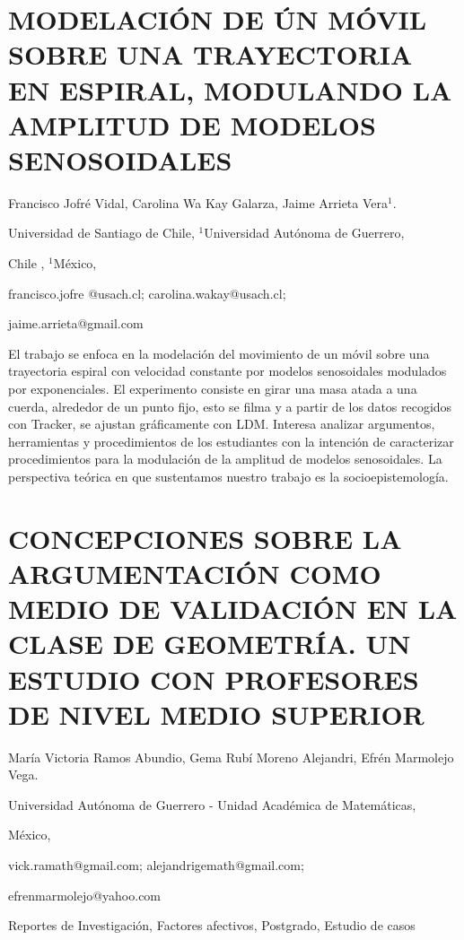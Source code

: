 \section{MODELACIÓN DE ÚN MÓVIL SOBRE UNA TRAYECTORIA EN ESPIRAL, MODULANDO
LA AMPLITUD DE MODELOS SENOSOIDALES }

\begin{datos}

Francisco Jofré Vidal, Carolina Wa Kay Galarza, Jaime Arrieta Vera$^{1}$.

Universidad de Santiago de Chile, $^{1}$Universidad Autónoma de Guerrero,

Chile , $^{1}$México,

francisco.jofre @usach.cl; carolina.wakay@usach.cl;

jaime.arrieta@gmail.com 

\end{datos}

El trabajo se enfoca en la modelación del movimiento de un móvil sobre
una trayectoria espiral con velocidad constante por modelos senosoidales
modulados por exponenciales. El experimento consiste en girar una
masa atada a una cuerda, alrededor de un punto fijo, esto se filma
y a partir de los datos recogidos con Tracker, se ajustan gráficamente
con LDM. Interesa analizar argumentos, herramientas y procedimientos
de los estudiantes con la intención de caracterizar procedimientos
para la modulación de la amplitud de modelos senosoidales. La perspectiva
teórica en que sustentamos nuestro trabajo es la socioepistemología.


\section{CONCEPCIONES SOBRE LA ARGUMENTACIÓN COMO MEDIO DE VALIDACIÓN EN LA
CLASE DE GEOMETRÍA. UN ESTUDIO CON PROFESORES DE NIVEL MEDIO SUPERIOR}

\begin{datos}

María Victoria Ramos Abundio, Gema Rubí Moreno Alejandri, Efrén Marmolejo
Vega.

Universidad Autónoma de Guerrero - Unidad Académica de Matemáticas, 

México,

vick.ramath@gmail.com; alejandrigemath@gmail.com;

efrenmarmolejo@yahoo.com 

\end{datos}

Reportes de Investigación, Factores afectivos, Postgrado, Estudio
de casos

